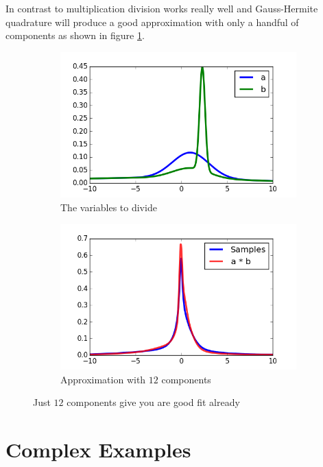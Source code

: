 \documentclass[11pt,a4paper]{book}
\begin{document}
In contrast to multiplication division works really well and Gauss-Hermite
quadrature will produce a good approximation with only a handful of components
as shown in figure \ref{fig:quotient}.
\begin{figure}[h]
  \centering
  \begin{subfigure}[t]{0.45\textwidth}
    \centering
    \includegraphics[width=\textwidth]{thesis/operations/quotient-vars}
    \caption{The variables to divide}
  \end{subfigure}
  \hfill
  \begin{subfigure}[t]{0.45\textwidth}
    \centering
    \includegraphics[width=\textwidth]{thesis/operations/quotient-2-components}
    \caption{Approximation with $12$ components}
  \end{subfigure}
  \caption{Just $12$ components give you are good fit already}
  \label{fig:quotient}
\end{figure}

\section{Complex Examples}
\end{document}
